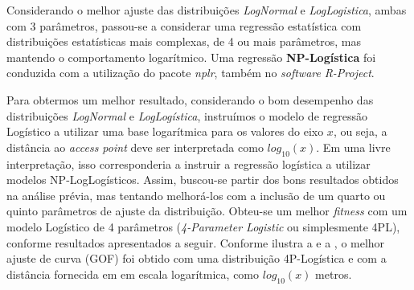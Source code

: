 \documentclass[
	12pt,				%
	twoside,			%
	a4paper,			%
	english,			%
	french,				%
	spanish,			%
	brazil				%
	]{abntex2}
\begin{document}
Considerando o melhor ajuste das distribuições \emph{LogNormal} e
\emph{LogLogistica}, ambas com 3 parâmetros, passou-se a considerar uma
regressão estatística com distribuições estatísticas mais complexas, de
4 ou mais parâmetros, mas mantendo o comportamento logarítmico. Uma
regressão \textbf{NP-Logística} foi conduzida com a utilização do pacote
\emph{nplr}, também no \emph{software} \emph{R-Project}.

Para obtermos um melhor resultado, considerando o bom desempenho das
distribuições \emph{LogNormal} e \emph{LogLogística}, instruímos o
modelo de regressão Logístico a utilizar uma base logarítmica para os
valores do eixo \(x\), ou seja, a distância ao \emph{access point} deve
ser interpretada como \(log_{10}(x)\). Em uma livre interpretação, isso
corresponderia a instruir a regressão logística a utilizar modelos
NP-LogLogísticos. Assim, buscou-se partir dos bons resultados obtidos na
análise prévia, mas tentando melhorá-los com a inclusão de um quarto ou
quinto parâmetros de ajuste da distribuição. Obteu-se um melhor
\emph{fitness} com um modelo Logístico de 4 parâmetros
(\emph{4-Parameter Logistic} ou simplesmente 4PL), conforme resultados
apresentados a seguir. Conforme ilustra a e a , o melhor ajuste de curva
(GOF) foi obtido com uma distribuição 4P-Logística e com a distância
fornecida em em escala logarítmica, como \(log_{10}(x)\) metros.
\end{document}
